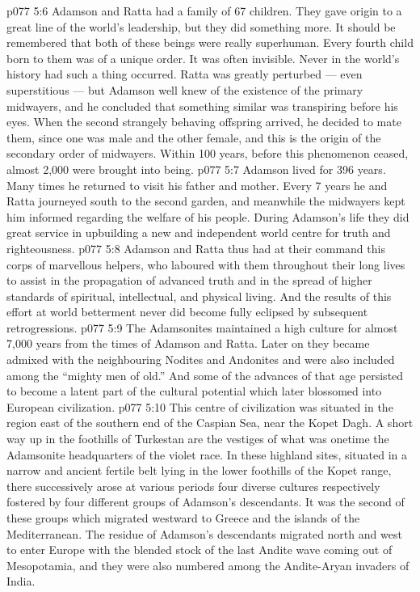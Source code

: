 \vs p077 5:6 \pc Adamson and Ratta had a family of 67 children. They gave origin to a great line of the world’s leadership, but they did something more. It should be remembered that both of these beings were really superhuman. Every fourth child born to them was of a unique order. It was often invisible. Never in the world’s history had such a thing occurred. Ratta was greatly perturbed --- even superstitious --- but Adamson well knew of the existence of the primary midwayers, and he concluded that something similar was transpiring before his eyes. When the second strangely behaving offspring arrived, he decided to mate them, since one was male and the other female, and this is the origin of the secondary order of midwayers. Within 100 years, before this phenomenon ceased, almost 2,000 were brought into being.
\vs p077 5:7 \pc Adamson lived for 396 years. Many times he returned to visit his father and mother. Every 7 years he and Ratta journeyed south to the second garden, and meanwhile the midwayers kept him informed regarding the welfare of his people. During Adamson’s life they did great service in upbuilding a new and independent world centre for truth and righteousness.
\vs p077 5:8 Adamson and Ratta thus had at their command this corps of marvellous helpers, who laboured with them throughout their long lives to assist in the propagation of advanced truth and in the spread of higher standards of spiritual, intellectual, and physical living. And the results of this effort at world betterment never did become fully eclipsed by subsequent retrogressions.
\vs p077 5:9 \pc The Adamsonites maintained a high culture for almost 7,000 years from the times of Adamson and Ratta. Later on they became admixed with the neighbouring Nodites and Andonites and were also included among the “mighty men of old.” And some of the advances of that age persisted to become a latent part of the cultural potential which later blossomed into European civilization.
\vs p077 5:10 This centre of civilization was situated in the region east of the southern end of the Caspian Sea, near the Kopet Dagh. A short way up in the foothills of Turkestan are the vestiges of what was onetime the Adamsonite headquarters of the violet race. In these highland sites, situated in a narrow and ancient fertile belt lying in the lower foothills of the Kopet range, there successively arose at various periods four diverse cultures respectively fostered by four different groups of Adamson’s descendants. It was the second of these groups which migrated westward to Greece and the islands of the Mediterranean. The residue of Adamson’s descendants migrated north and west to enter Europe with the blended stock of the last Andite wave coming out of Mesopotamia, and they were also numbered among the Andite\hyp{}Aryan invaders of India.
